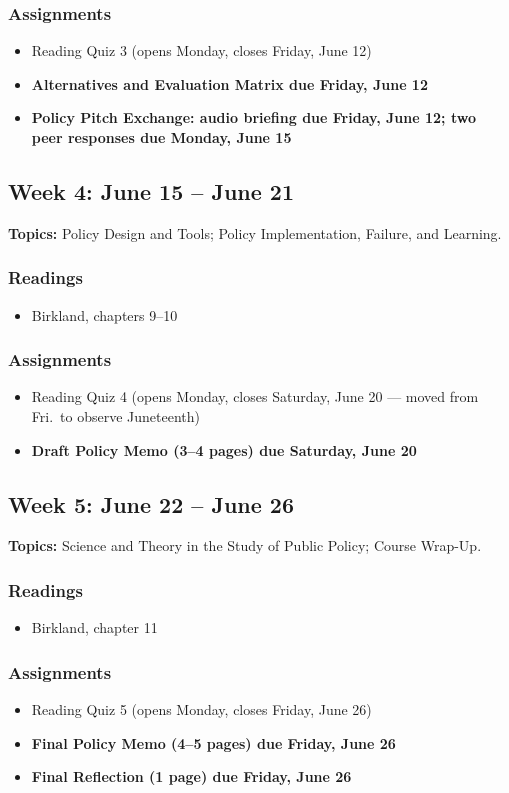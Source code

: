 \documentclass[12pt]{article}
\begin{document}
\subsubsection*{Assignments}
    \begin{itemize}
        \item Reading Quiz 3 (opens Monday, closes Friday, June 12)
        \item \textbf{Alternatives and Evaluation Matrix due Friday, June 12}
        \item \textbf{Policy Pitch Exchange: audio briefing due Friday, June 12; two peer responses due Monday, June 15}
    \end{itemize}

\subsection*{Week 4: June 15 -- June 21}
\noindent \textbf{Topics:} Policy Design and Tools; Policy Implementation, Failure, and Learning.
\subsubsection*{Readings}
    \begin{itemize}
        \item Birkland, chapters 9--10
    \end{itemize}
\subsubsection*{Assignments}
    \begin{itemize}
        \item Reading Quiz 4 (opens Monday, closes Saturday, June 20 --- moved from Fri.\ to observe Juneteenth)
        \item \textbf{Draft Policy Memo (3--4 pages) due Saturday, June 20}
    \end{itemize}

\subsection*{Week 5: June 22 -- June 26}
\noindent \textbf{Topics:} Science and Theory in the Study of Public Policy; Course Wrap-Up.
\subsubsection*{Readings}
    \begin{itemize}
        \item Birkland, chapter 11
    \end{itemize}
\subsubsection*{Assignments}
    \begin{itemize}
        \item Reading Quiz 5 (opens Monday, closes Friday, June 26)
        \item \textbf{Final Policy Memo (4--5 pages) due Friday, June 26}
        \item \textbf{Final Reflection (1 page) due Friday, June 26}
    \end{itemize}
\end{document}
